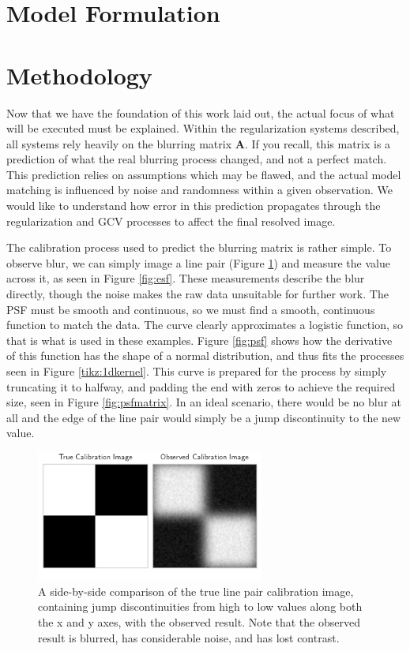 \documentclass[letterpaper, 10pt, titlepage, twocolumn]{article}
\begin{document}
\section*{Model Formulation}


\section*{Methodology}
Now that we have the foundation of this work laid out, the actual focus of what will be executed must be explained. Within the regularization systems described, all systems rely heavily on the blurring matrix \textbf{A}. If you recall, this matrix is a prediction of what the real blurring process changed, and not a perfect match. This prediction relies on assumptions which may be flawed, and the actual model matching is influenced by noise and randomness within a given observation. We would like to understand how error in this prediction propagates through the regularization and GCV processes to affect the final resolved image.

The calibration process used to predict the blurring matrix is rather simple. To observe blur, we can simply image a line pair (Figure \ref{fig:linepairs}) and measure the value across it, as seen in Figure \ref{fig:esf}. These measurements describe the blur directly, though the noise makes the raw data unsuitable for further work. The PSF must be smooth and continuous, so we must find a smooth, continuous function to match the data. The curve clearly approximates a logistic function, so that is what is used in these examples. Figure \ref{fig:psf} shows how the derivative of this function has the shape of a normal distribution, and thus fits the processes seen in Figure \ref{tikz:1dkernel}. This curve is prepared for the process by simply truncating it to halfway, and padding the end with zeros to achieve the required size, seen in Figure \ref{fig:psfmatrix}. In an ideal scenario, there would be no blur at all and the edge of the line pair would simply be a jump discontinuity to the new value.

\begin{figure}[H]
  \centering
  \includegraphics[width=7.5cm]{imgcompare.png}
  \caption{A side-by-side comparison of the true line pair calibration image, containing jump discontinuities from high to low values along both the x and y axes, with the observed result. Note that the observed result is blurred, has considerable noise, and has lost contrast.}
  \label{fig:linepairs}
\end{figure}
\end{document}
